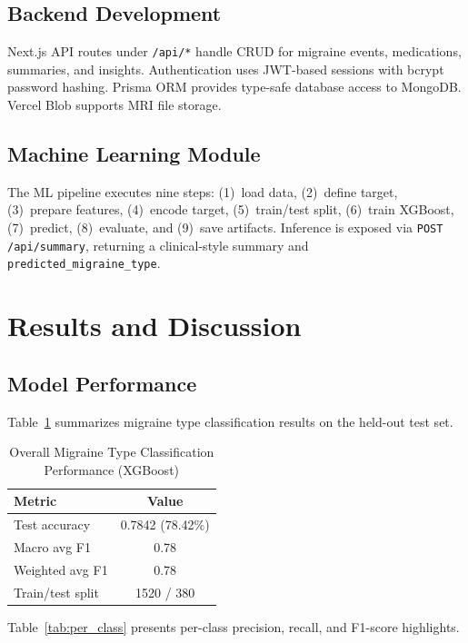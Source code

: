 \documentclass[conference,twocolumn,letterpaper]{IEEEtran}
\begin{document}
\subsection{Backend Development}
Next.js API routes under \texttt{/api/*} handle CRUD for migraine events, medications, summaries, and insights. Authentication uses JWT-based sessions with bcrypt password hashing. Prisma ORM provides type-safe database access to MongoDB. Vercel Blob supports MRI file storage.

\subsection{Machine Learning Module}
The ML pipeline executes nine steps: (1)~load data, (2)~define target, (3)~prepare features, (4)~encode target, (5)~train/test split, (6)~train XGBoost, (7)~predict, (8)~evaluate, and (9)~save artifacts. Inference is exposed via \texttt{POST /api/summary}, returning a clinical-style summary and \texttt{predicted\_migraine\_type}.

\section{Results and Discussion}

\subsection{Model Performance}
Table~\ref{tab:model_perf} summarizes migraine type classification results on the held-out test set.

\begin{table}[htbp]
\caption{Overall Migraine Type Classification Performance (XGBoost)}
\label{tab:model_perf}
\centering
\begin{tabular}{@{}lc@{}}
\toprule
\textbf{Metric} & \textbf{Value} \\
\midrule
Test accuracy & 0.7842 (78.42\%) \\
Macro avg F1 & 0.78 \\
Weighted avg F1 & 0.78 \\
Train/test split & 1520 / 380 \\
\bottomrule
\end{tabular}
\end{table}

Table~\ref{tab:per_class} presents per-class precision, recall, and F1-score highlights.
\end{document}
